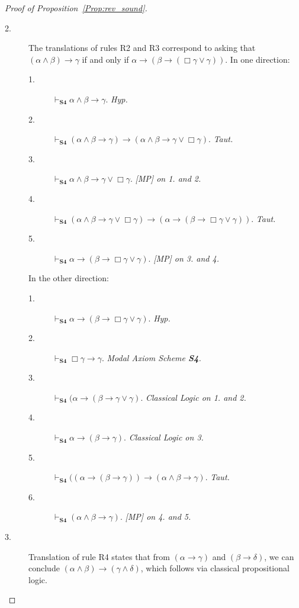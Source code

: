 \documentclass[10pt,a4paper]{amsart}
\newcommand{\SFour}{\textbf{S4}\xspace}
\begin{document}
\begin{proof}[Proof of Proposition~\ref{Prop:rev_sound}]
\begin{description}
\item[2.] The translations of rules R2 and R3 correspond to asking that $(\alpha \land \beta)\rightarrow\gamma$ if and only if $\alpha \rightarrow (\beta \rightarrow (\Box \gamma \lor \gamma))$. In one direction:
\begin{description}
    \item[1.] $\vdash_{\SFour}\alpha \land \beta \rightarrow \gamma$.\textit{ Hyp.}
    \item[2.] $\vdash_{\SFour}(\alpha \land \beta \rightarrow \gamma) \rightarrow (\alpha \land \beta \rightarrow \gamma \lor \Box \gamma)$. \textit{Taut.}
    \item[3.] $\vdash_{\SFour}\alpha \land \beta \rightarrow \gamma \lor \Box \gamma$. \textit{[MP] on 1. and 2.}
    \item[4.] $\vdash_{\SFour}(\alpha \land \beta \rightarrow \gamma \lor \Box \gamma) \rightarrow (\alpha \rightarrow (\beta \rightarrow \Box \gamma \lor \gamma))$. \textit{Taut.}
    \item[5.] $\vdash_{\SFour}\alpha \rightarrow (\beta \rightarrow \Box \gamma \lor \gamma)$. \textit{[MP] on 3. and 4.}
    
\end{description}
In the other direction:
\begin{description}
    \item[1.] $\vdash_{\SFour}\alpha \rightarrow(\beta\rightarrow\Box \gamma \lor \gamma)$. \textit{ Hyp.}
    \item[2.] $\vdash_{\SFour}\Box \gamma \rightarrow \gamma$. \textit{ Modal Axiom Scheme \SFour.}
    \item[3.] $\vdash_{\SFour}(\alpha \rightarrow(\beta\rightarrow\gamma \lor \gamma).$ \textit{Classical Logic on 1. and 2.}
    \item[4.] $\vdash_{\SFour}\alpha \rightarrow(\beta\rightarrow \gamma).$ \textit{Classical Logic on 3.}
    \item[5.] $\vdash_{\SFour}((\alpha \rightarrow (\beta \rightarrow \gamma)) \rightarrow (\alpha \land \beta \rightarrow \gamma)$. \textit{Taut.}
    \item[6.] $\vdash_{\SFour}(\alpha \land \beta \rightarrow \gamma).$ \textit{[MP] on 4. and 5.}
\end{description}

    \item[3.] Translation of rule R4 states that from $(\alpha \rightarrow \gamma)$ and $(\beta \rightarrow \delta)$, we can conclude $( \alpha \land \beta)\rightarrow (\gamma \land \delta)$, which follows via classical propositional logic.

\end{description}
    

\end{proof}
\end{document}
